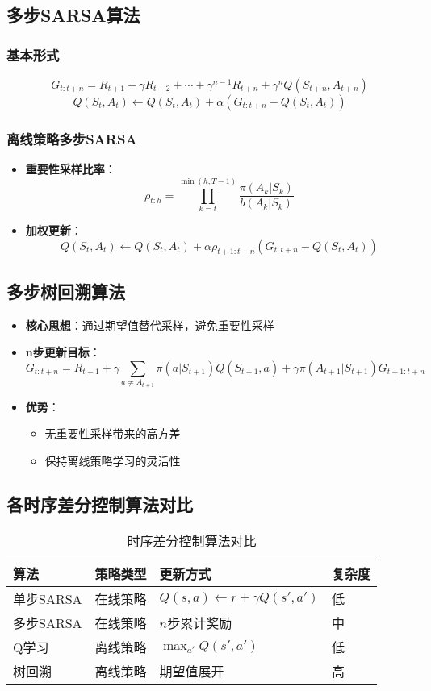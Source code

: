 \subsection{多步SARSA算法}
\subsubsection{基本形式}
\[
G_{t:t+n} = R_{t+1} + \gamma R_{t+2} + \cdots + \gamma^{n-1}R_{t+n} + \gamma^n Q(S_{t+n},A_{t+n})
\]
\[
Q(S_t,A_t) \leftarrow Q(S_t,A_t) + \alpha \left( G_{t:t+n} - Q(S_t,A_t) \right)
\]

\subsubsection{离线策略多步SARSA}
\begin{itemize}
    \item \textbf{重要性采样比率}：
        \[
        \rho_{t:h} = \prod_{k=t}^{\min(h,T-1)} \frac{\pi(A_k|S_k)}{b(A_k|S_k)}
        \]
    \item \textbf{加权更新}：
        \[
        Q(S_t,A_t) \leftarrow Q(S_t,A_t) + \alpha \rho_{t+1:t+n} \left( G_{t:t+n} - Q(S_t,A_t) \right)
        \]
\end{itemize}

\subsection{多步树回溯算法}
\begin{itemize}
    \item \textbf{核心思想}：通过期望值替代采样，避免重要性采样
    \item \textbf{n步更新目标}：
        \[
        G_{t:t+n} = R_{t+1} + \gamma \sum_{a \neq A_{t+1}} \pi(a|S_{t+1})Q(S_{t+1},a) + \gamma \pi(A_{t+1}|S_{t+1})G_{t+1:t+n}
        \]
    \item \textbf{优势}：
        \begin{itemize}
            \item 无重要性采样带来的高方差
            \item 保持离线策略学习的灵活性
        \end{itemize}
\end{itemize}

\subsection{各时序差分控制算法对比}
\begin{table}[H]  %
\centering
\caption{时序差分控制算法对比}
\begin{tabular}{llll}
\toprule
\textbf{算法} & \textbf{策略类型} & \textbf{更新方式} & \textbf{复杂度} \\
\midrule
单步SARSA & 在线策略 & $Q(s,a) \leftarrow r+\gamma Q(s',a')$ & 低 \\
多步SARSA & 在线策略 & $n$步累计奖励 & 中 \\
Q学习 & 离线策略 & $\max_{a'}Q(s',a')$ & 低 \\
树回溯 & 离线策略 & 期望值展开 & 高 \\
\bottomrule
\end{tabular}
\end{table}

